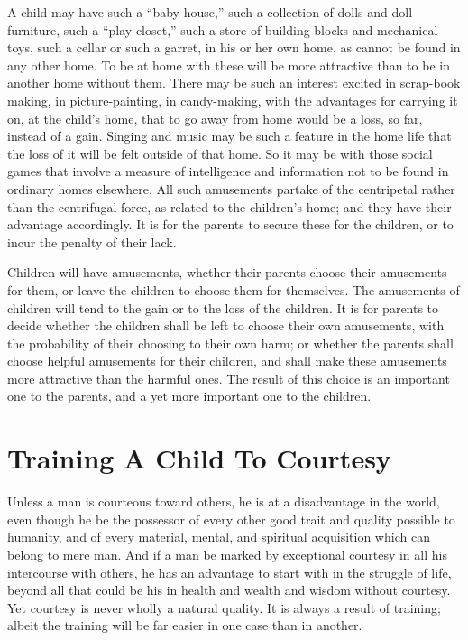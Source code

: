 \documentclass[
]{book}
\begin{document}
A child may have such a ``baby-house,'' such a collection of dolls and doll-furniture, such a ``play-closet,'' such a store of building-blocks and mechanical toys, such a cellar or such a garret, in his or her own home, as cannot be found in any other home. To be at home with these will be more attractive than to be in another home without them. There may be such an interest excited in scrap-book making, in picture-painting, in candy-making, with the advantages for carrying it on, at the child's home, that to go away from home would be a loss, so far, instead of a gain. Singing and music may be such a feature in the home life that the loss of it will be felt outside of that home. So it may be with those social games that involve a measure of intelligence and information not to be found in ordinary homes elsewhere. All such amusements partake of the centripetal rather than the centrifugal force, as related to the children's home; and they have their advantage accordingly. It is for the parents to secure these for the children, or to incur the penalty of their lack.

Children will have amusements, whether their parents choose their amusements for them, or leave the children to choose them for themselves. The amusements of children will tend to the gain or to the loss of the children. It is for parents to decide whether the children shall be left to choose their own amusements, with the probability of their choosing to their own harm; or whether the parents shall choose helpful amusements for their children, and shall make these amusements more attractive than the harmful ones. The result of this choice is an important one to the parents, and a yet more important one to the children.

\hypertarget{training-a-child-to-courtesy}{%
\chapter{Training A Child To Courtesy}\label{training-a-child-to-courtesy}}

Unless a man is courteous toward others, he is at a disadvantage in the world, even though he be the possessor of every other good trait and quality possible to humanity, and of every material, mental, and spiritual acquisition which can belong to mere man. And if a man be marked by exceptional courtesy in all his intercourse with others, he has an advantage to start with in the struggle of life, beyond all that could be his in health and wealth and wisdom without courtesy. Yet courtesy is never wholly a natural quality. It is always a result of training; albeit the training will be far easier in one case than in another.
\end{document}
